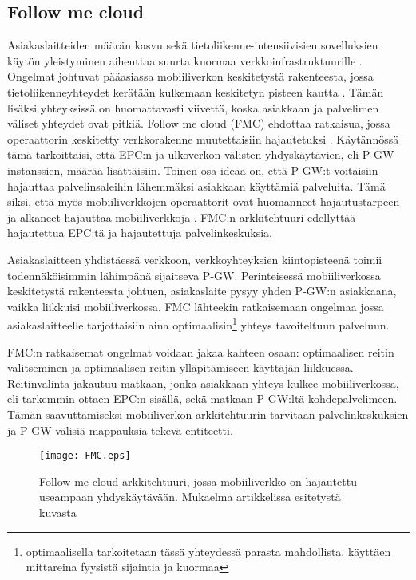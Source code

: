 \subsection{Follow me cloud} \label{fmc}

Asiakaslaitteiden määrän kasvu sekä tietoliikenne-intensiivisien sovelluksien käytön yleistyminen aiheuttaa suurta kuormaa verkkoinfrastruktuurille \cite{taleb2013follow}. Ongelmat johtuvat pääasiassa mobiiliverkon keskitetystä rakenteesta, jossa tietoliikenneyhteydet kerätään kulkemaan keskitetyn pisteen kautta \cite{taleb2013follow}. Tämän lisäksi yhteyksissä on huomattavasti viivettä, koska asiakkaan ja palvelimen väliset yhteydet ovat pitkiä. Follow me cloud (FMC) ehdottaa ratkaisua, jossa operaattorin keskitetty verkkorakenne muutettaisiin hajautetuksi \cite{taleb2013follow}.
Käytännössä tämä tarkoittaisi, että EPC:n ja ulkoverkon välisten yhdyskäytävien, eli P-GW instanssien, määrää lisättäisiin. 
Toinen osa ideaa on, että P-GW:t voitaisiin hajauttaa palvelinsaleihin lähemmäksi asiakkaan käyttämiä palveluita. Tämä siksi, että myös mobiiliverkkojen operaattorit ovat huomanneet hajautustarpeen ja alkaneet hajauttaa mobiiliverkkoja \cite{taleb2013follow}. 
FMC:n arkkitehtuuri edellyttää hajautettua EPC:tä ja hajautettuja palvelinkeskuksia. 

Asiakaslaitteen yhdistäessä verkkoon, verkkoyhteyksien kiintopisteenä toimii todennäköisimmin lähimpänä sijaitseva P-GW. 
Perinteisessä mobiiliverkossa keskitetystä rakenteesta johtuen, asiakaslaite pysyy yhden P-GW:n asiakkaana, vaikka liikkuisi mobiiliverkossa.
FMC lähteekin ratkaisemaan ongelmaa jossa asiakaslaitteelle tarjottaisiin aina optimaalisin\footnote{optimaalisella tarkoitetaan tässä yhteydessä parasta mahdollista, käyttäen mittareina fyysistä sijaintia ja kuormaa} yhteys tavoiteltuun palveluun.

FMC:n ratkaisemat ongelmat voidaan jakaa kahteen osaan: optimaalisen reitin valitseminen ja optimaalisen reitin ylläpitämiseen käyttäjän liikkuessa. 
Reitinvalinta jakautuu matkaan, jonka asiakkaan yhteys kulkee mobiiliverkossa, eli tarkemmin ottaen EPC:n sisällä, sekä matkaan P-GW:ltä kohdepalvelimeen. Tämän saavuttamiseksi mobiiliverkon arkkitehtuurin tarvitaan palvelinkeskuksien ja P-GW välisiä mappauksia tekevä entiteetti. 

\begin{figure}[tb]
\texttt{[image: FMC.eps]}
\caption{Follow me cloud arkkitehtuuri, jossa mobiiliverkko on hajautettu useampaan yhdyskäytävään. Mukaelma artikkelissa \cite{mach17mobile} esitetystä kuvasta} \label{fig:fmc}
\end{figure}

